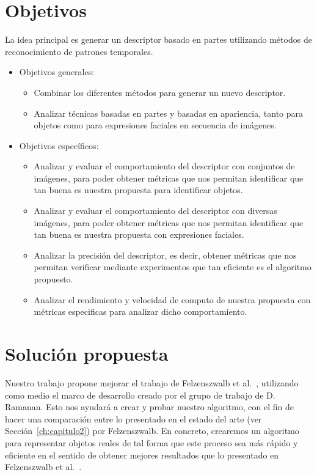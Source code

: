 \section{Objetivos}
La idea principal es generar un descriptor basado en partes utilizando métodos de reconocimiento de patrones temporales.
\begin{itemize}
		\item Objetivos generales:
			\begin{itemize}
				\item Combinar los diferentes métodos para generar un nuevo descriptor.
				\item Analizar técnicas basadas en partes y basadas en apariencia, tanto para objetos como para expresiones faciales en secuencia de imágenes.
			\end{itemize}
		\item Objetivos específicos:
			\begin{itemize}
				\item Analizar y evaluar el comportamiento del descriptor con conjuntos de imágenes, para poder obtener métricas que nos permitan identificar que tan buena es nuestra propuesta para identificar objetos.
				\item Analizar y evaluar el comportamiento del descriptor con diversas imágenes, para poder obtener métricas que nos permitan identificar que tan buena es nuestra propuesta con expresiones faciales.
				\item Analizar la precisión del descriptor, es decir, obtener métricas que nos permitan verificar mediante experimentos que tan eficiente es el algoritmo propuesto.
				\item Analizar el rendimiento y velocidad de computo de nuestra propuesta con métricas especificas para analizar dicho comportamiento.
				
			\end{itemize}			

	\end{itemize}

\section{Solución propuesta}

Nuestro trabajo propone mejorar el trabajo de Felzenszwalb et al.~\cite{Felzenszwalb2010}, utilizando como medio el marco de desarrollo creado por el grupo de trabajo de D. Ramanan. Esto nos ayudará a crear y probar nuestro algoritmo, con el fin de hacer una comparación entre lo presentado en el estado del arte (ver Sección~\ref{ch:capitulo2}) por Felzenszwalb. En concreto, crearemos un algoritmo para representar objetos reales de tal forma que este proceso sea más rápido y eficiente en el sentido de obtener mejores resultados que lo presentado en Felzenszwalb et al.~\cite{Felzenszwalb2010}.

